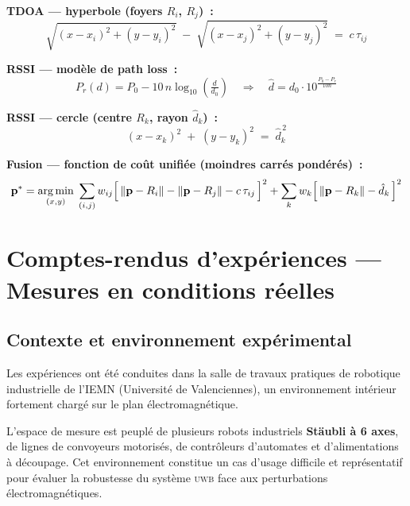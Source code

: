 \documentclass[12pt, a4paper]{article}
\newcommand{\UWB}{\textsc{uwb}}
\begin{document}
\begin{tcolorbox}[
  enhanced, breakable,
  colback=iemnlightblue!30, colframe=iemnblue,
  arc=5pt, left=12pt, right=12pt, top=8pt, bottom=8pt,
  title={\textbf{Synthèse mathématique du problème de fusion TDOA + RSSI}},
  fonttitle=\small\bfseries\color{white},
  coltitle=white, attach boxed title to top left={yshift=-2mm, xshift=5mm},
  boxed title style={colback=iemnblue, arc=3pt}
]
\textbf{TDOA — hyperbole (foyers $R_i$, $R_j$)~:}
\[
  \sqrt{(x-x_i)^2+(y-y_i)^2} \;-\; \sqrt{(x-x_j)^2+(y-y_j)^2} \;=\; c\,\tau_{ij}
\]

\medskip
\textbf{RSSI — modèle de path loss~:}
\[
  P_r(d) = P_0 - 10\,n\log_{10}\!\left(\tfrac{d}{d_0}\right)
  \quad\Longrightarrow\quad
  \hat{d} = d_0 \cdot 10^{\frac{P_0 - P_r}{10n}}
\]

\medskip
\textbf{RSSI — cercle (centre $R_k$, rayon $\hat{d}_k$)~:}
\[
  (x-x_k)^2 \;+\; (y-y_k)^2 \;=\; \hat{d}_k^{\,2}
\]

\medskip
\textbf{Fusion — fonction de coût unifiée (moindres carrés pondérés)~:}
\[
  \mathbf{p}^* = \underset{(x,y)}{\arg\min}\;
  \sum_{(i,j)} w_{ij}
  \Bigl[\,
    \|\mathbf{p}-R_i\| - \|\mathbf{p}-R_j\| - c\,\tau_{ij}
  \,\Bigr]^2
  +
  \sum_{k} w_k
  \Bigl[\,
    \|\mathbf{p}-R_k\| - \hat{d}_k
  \,\Bigr]^2
\]
\end{tcolorbox}

\newpage
\section{Comptes-rendus d'expériences — Mesures en conditions réelles}

\subsection{Contexte et environnement expérimental}

Les expériences ont été conduites dans la salle de travaux pratiques de robotique
industrielle de l'IEMN (Université de Valenciennes), un environnement intérieur
fortement chargé sur le plan électromagnétique.

L'espace de mesure est peuplé de plusieurs robots industriels \textbf{Stäubli à 6
axes}, de lignes de convoyeurs motorisés, de contrôleurs d'automates et
d'alimentations à découpage. Cet environnement constitue un cas d'usage difficile
et représentatif pour évaluer la robustesse du système \UWB{} face aux perturbations
électromagnétiques.
\end{document}
